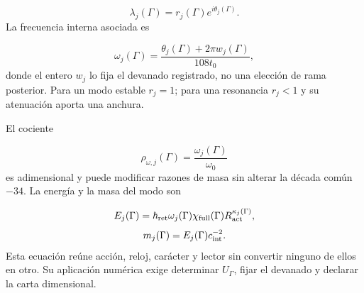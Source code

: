 \[
 \lambda_j(\Gamma)=r_j(\Gamma)e^{i\theta_j(\Gamma)}.
\]
La frecuencia interna asociada es

\[
 \omega_j(\Gamma)
 =\frac{\theta_j(\Gamma)+2\pi w_j(\Gamma)}{108t_0},
\]
donde el entero \(w_j\) lo fija el devanado registrado, no una elección de rama posterior. Para un modo estable \(r_j=1\); para una resonancia \(r_j<1\) y su atenuación aporta una anchura.

El cociente

\[
 \rho_{\omega,j}(\Gamma)
 =\frac{\omega_j(\Gamma)}{\omega_0}
\]
es adimensional y puede modificar razones de masa sin alterar la década común \(-34\). La energía y la masa del modo son

\[
 E_j(\Gamma)=\hbar_{\rm ret}\omega_j(\Gamma)
 \chi_{\rm full}(\Gamma)R_{\rm act}^{\kappa_j(\Gamma)},
\]
\[
 m_j(\Gamma)=E_j(\Gamma)c_{\rm int}^{-2}.
\]
Esta ecuación reúne acción, reloj, carácter y lector sin convertir ninguno de ellos en otro. Su aplicación numérica exige determinar \(U_\Gamma\), fijar el devanado y declarar la carta dimensional.


